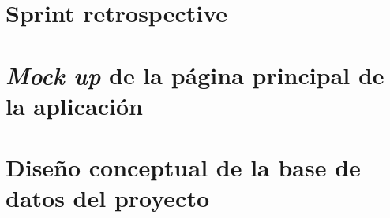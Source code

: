 \documentclass{article}
\begin{document}
\section{Sprint retrospective}

\section{\textit{Mock up} de la página principal de la aplicación}

\section{Diseño conceptual de la base de datos del proyecto}


\newpage


\end{document}
